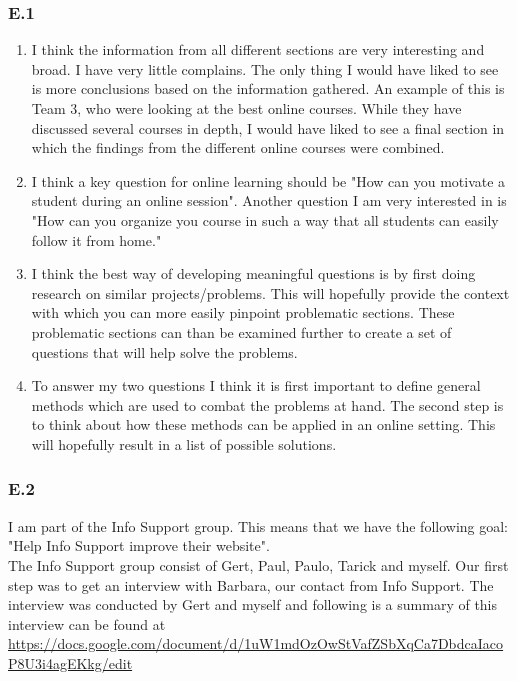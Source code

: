 \documentclass[]{article}
\begin{document}
\subsubsection*{E.1}
\begin{enumerate}[\textbf{a.}]
    \item I think the information from all different sections are very interesting 
    and broad. I have very little complains. The only thing I would have liked 
    to see is more conclusions based on the information gathered. An example of 
    this is Team 3, who were looking at the best online courses. While they have 
    discussed several courses in depth, I would have liked to see a final section
    in which the findings from the different online courses were combined.
    \item I think a key question for online learning should be "How can you 
    motivate a student during an online session". Another question I am very 
    interested in is "How can you organize you course in such a way that all 
    students can easily follow it from home."
    \item I think the best way of developing meaningful questions is by first 
    doing research on similar projects/problems. This will hopefully provide 
    the context with which you can more easily pinpoint problematic sections. 
    These problematic sections can than be examined further to create a set 
    of questions that will help solve the problems. 
    \item To answer my two questions I think it is first important to define general
    methods which are used to combat the problems at hand. The second step is to 
    think about how these methods can be applied in an online setting. 
    This will hopefully result in a list of possible solutions.
\end{enumerate}

\subsubsection*{E.2} \label{3.E.2}
I am part of the Info Support group. This means that we have the following goal:
"Help Info Support improve their website".\\
The Info Support group consist of Gert, Paul, Paulo, Tarick and myself. 
Our first step was to get an interview with Barbara, our contact from Info Support.
The interview was conducted by Gert and myself and following is a summary of 
this interview can be found at \url{https://docs.google.com/document/d/1uW1mdOzOwStVafZSbXqCa7DbdcaIacoP8U3i4agEKkg/edit}\\
\end{document}
